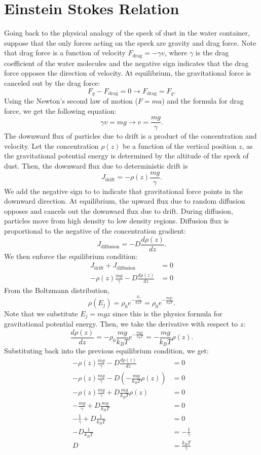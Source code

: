 \documentclass{article}
\begin{document}
\section{Einstein Stokes Relation}
Going back to the physical analogy of the speck of dust in the water container, suppose that the only forces acting on the speck are gravity and drag force. Note that drag force is a function of velocity $F_{\text{drag}} = -\gamma v$, where $\gamma$ is the drag coefficient of the water molecules and the negative sign indicates that the drag force opposes the direction of velocity. At equilibrium, the gravitational force is canceled out by the drag force:
\[F_g - F_{\text{drag}} = 0 \to F_{\text{drag}} = F_g.\]
Using the Newton's second law of motion ($F=ma$) and the formula for drag force, we get the following equation:
\[\gamma v = mg \to v = \frac{mg}{\gamma}.\]
The downward flux of particles due to drift is a product of the concentration and velocity. Let the concentration $\rho(z)$ be a function of the vertical position $z$, as the gravitational potential energy is determined by the altitude of the speck of dust. Then, the downward flux due to deterministic drift is
\[J_{\text{drift}} = -\rho(z) \frac{mg}{\gamma}.\]
We add the negative sign to to indicate that gravitational force points in the downward direction. At equilibrium, the upward flux due to random diffusion opposes and cancels out the downward flux due to drift. During diffusion, particles move from high density to low density regions. Diffusion flux is proportional to the negative of the concentration gradient:
\[J_{\text{diffusion}} = - D \frac{d\rho (z)}{dz}.\]
We then enforce the equilibrium condition:
\begin{align*}
    J_{\text{drift}} + J_{\text{diffusion}} &= 0\\
    -\rho(z) \frac{mg}{\gamma} - D \frac{d\rho (z)}{dz} &= 0
\end{align*}
From the Boltzmann distribution, 
\[\rho(E_j) = \rho_0 e^{-\frac{E_j}{k_B T}}=\rho_0 e^{-\frac{mgz}{k_B T}}.\]
Note that we substitute $E_j=mgz$ since this is the physics formula for gravitational potential energy. Then, we take the derivative with respect to $z$:
\[\frac{d\rho (z)}{dz} = -\rho_0 \frac{mg}{k_B T}e^{-\frac{mgz}{k_B T}} = - \frac{mg}{k_B T} \rho (z).\]
Substituting back into the previous equilibrium condition, we get:
\begin{align*}
    -\rho(z) \frac{mg}{\gamma} - D \frac{d\rho (z)}{dz} &= 0\\
    -\rho(z) \frac{mg}{\gamma} - D  \left(- \frac{mg}{k_B T} \rho (z)\right) &= 0\\
    -\rho(z) \frac{mg}{\gamma} + D \frac{mg}{k_B T} \rho (z) &= 0\\
    -\frac{mg}{\gamma} + D \frac{mg}{k_B T} &= 0\\
    -\frac{1}{\gamma} + D \frac{1}{k_B T} &= 0\\
    -D \frac{1}{k_B T} &= -\frac{1}{\gamma} \\
    D &= \frac{k_B T}{\gamma}
\end{align*}
\end{document}
